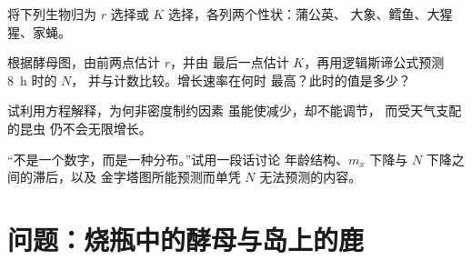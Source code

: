 \begin{exercise}[$\star\star$]\label{exo:b1:populations:9}
将下列生物归为 $r$ 选择或 $K$ 选择，各列两个性状：蒲公英、
大象、鳕鱼、大猩猩、家蝇。
\end{exercise}

\begin{exercise}[$\star\star\star$]\label{exo:b1:populations:10}
根据酵母图，由前两点估计 $r$，并由
最后一点估计 $K$，再用逻辑斯谛公式预测 \qty{8}{h} 时的 $N$，
并与计数比较。增长速率在何时
最高？此时的值是多少？
\end{exercise}

\begin{exercise}[$\star\star\star$]\label{exo:b1:populations:11}
试利用方程解释，为何非密度制约因素
虽能使减少，却不能调节，
而受天气支配的昆虫
仍不会无限增长。
\end{exercise}

\begin{exercise}[$\star\star\star$]\label{exo:b1:populations:12}
“不是一个数字，而是一种分布。”试用一段话讨论
年龄结构、$m_x$ 下降与 $N$ 下降之间的滞后，以及
金字塔图所能预测而单凭 $N$ 无法预测的内容。
\end{exercise}

\section{问题：烧瓶中的酵母与岛上的鹿}

